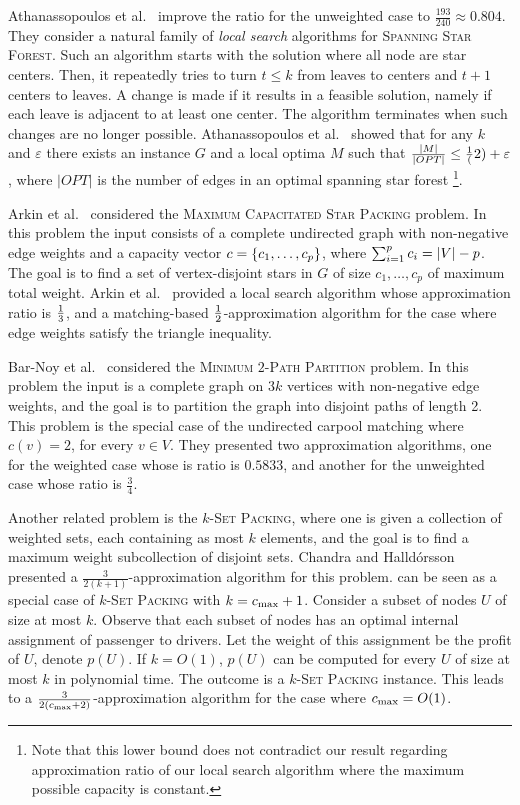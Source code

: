 Athanassopoulos et al.~\cite{ACKK09} improve the ratio for the
unweighted case to $\frac{193}{240} \approx 0.804$.
%
They consider a natural family of \emph{local search} algorithms
for \textsc{Spanning Star Forest}.  Such an algorithm starts with the
solution where all node are star centers.  Then, it repeatedly tries
to turn $t \leq k$ from leaves to centers and $t+1$ centers to leaves.
A change is made if it results in a feasible solution, namely if each
leave is adjacent to at least one center.  The algorithm terminates
when such changes are no longer possible.  Athanassopoulos et
al.~\cite{ACKK09} showed that for any $k$ and $\varepsilon$ there exists an
instance $G$ and a local optima $M$ such that 
$\frac{|M|}{|OPT|} \leq \frac{1}{(}2) + \varepsilon$, where $|OPT|$ is the number of
edges in an optimal spanning star forest \footnote{Note that this lower bound
does not contradict our result regarding approximation ratio of our local
search algorithm where the maximum possible capacity is constant.}.

Arkin et al.~\cite{arkin2004approximations} considered
the \textsc{Maximum Capacitated Star Packing} problem.  In this
problem the input consists of a complete undirected graph with
non-negative edge weights and a capacity vector $c
= \left\{ c_1,\ldots,c_p \right\}$, where $\sum_{i=1}^p c_i = \left| V \right| - p$.  The
goal is to find a set of vertex-disjoint stars in $G$ of size
$c_1,\ldots,c_p$ of maximum total weight.  Arkin et
al.~\cite{arkin2004approximations} provided a local search algorithm
whose approximation ratio is $\frac{1}{3}$, and a matching-based
$\frac{1}{2}$-approximation algorithm for the case where edge weights
satisfy the triangle inequality.

Bar-Noy et al.~\cite{bar2015improved} considered the
\textsc{Minimum $2$-Path Partition} problem.
In this problem the input is a complete graph on $3k$ vertices with
non-negative edge weights, and the goal is to partition the graph into
disjoint paths of length 2.  This problem is the special case of the
undirected carpool matching where $c(v) = 2$, for every $v \in V$.
They presented two approximation algorithms, one for the weighted case
whose is ratio is $0.5833$, and another for the unweighted case whose
ratio is $\frac{3}{4}$.

Another related problem is the \textsc{$k$-Set Packing}, where one is
given a collection of weighted sets, each containing as most $k$
elements, and the goal is to find a maximum weight subcollection of
disjoint sets.  Chandra and Halld\'orsson~\cite{chandra2001greedy}
presented a $\frac{3}{2(k+1)}$-approximation algorithm for this
problem.
%
\carpool can be seen as a special case of \textsc{$k$-Set Packing}
with $k = c_{\max} + 1$.  Consider a subset of nodes $U$ of size at most
$k$.  Observe that each subset of nodes has an optimal internal
assignment of passenger to drivers.  Let the weight of this assignment
be the profit of $U$, denote $p(U)$.  If $k = O(1)$, $p(U)$ can be
computed for every $U$ of size at most $k$ in polynomial time.  The
outcome is a \textsc{$k$-Set Packing} instance.  This leads to a
$\frac{3}{2(c_{\max}+2)}$-approximation algorithm for the case where
$c_{\max} = O(1)$.


